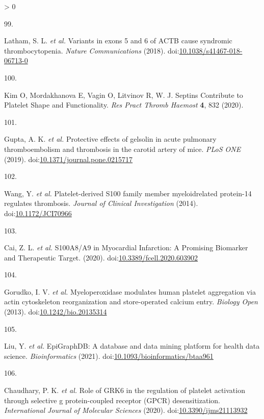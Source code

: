 \documentclass[11pt,twoside]{bristolthesis}
\newlength{\cslhangindent}
\newlength{\csllabelwidth}
\newenvironment{CSLReferences}[2] %
 {%
  \setlength{\parindent}{0pt}
  \ifodd #1 \everypar{\setlength{\hangindent}{\cslhangindent}}\ignorespaces\fi
  \ifnum #2 > 0
  \setlength{\parskip}{#2\baselineskip}
  \fi
 }%
 {}
\newcommand{\CSLLeftMargin}[1]{\parbox[t]{\csllabelwidth}{#1}}
\newcommand{\CSLRightInline}[1]{\parbox[t]{\linewidth - \csllabelwidth}{#1}\break}
\begin{document}
\begin{CSLReferences}{0}{0}
\leavevmode\hypertarget{ref-Latham2018}{}%
\CSLLeftMargin{99. }
\CSLRightInline{Latham, S. L. \emph{et al.} {Variants in exons 5 and 6 of ACTB cause syndromic thrombocytopenia}. \emph{Nature Communications} (2018). doi:\href{https://doi.org/10.1038/s41467-018-06713-0}{10.1038/s41467-018-06713-0}}

\leavevmode\hypertarget{ref-Kim2020}{}%
\CSLLeftMargin{100. }
\CSLRightInline{Kim O, Mordakhanova E, Vagin O, Litvinov R, W. J. {Septins Contribute to Platelet Shape and Functionality}. \emph{Res Pract Thromb Haemost} \textbf{4}, 832 (2020).}

\leavevmode\hypertarget{ref-Gupta2019}{}%
\CSLLeftMargin{101. }
\CSLRightInline{Gupta, A. K. \emph{et al.} {Protective effects of gelsolin in acute pulmonary thromboembolism and thrombosis in the carotid artery of mice}. \emph{PLoS ONE} (2019). doi:\href{https://doi.org/10.1371/journal.pone.0215717}{10.1371/journal.pone.0215717}}

\leavevmode\hypertarget{ref-Wang2014a}{}%
\CSLLeftMargin{102. }
\CSLRightInline{Wang, Y. \emph{et al.} {Platelet-derived S100 family member myeloidrelated protein-14 regulates thrombosis}. \emph{Journal of Clinical Investigation} (2014). doi:\href{https://doi.org/10.1172/JCI70966}{10.1172/JCI70966}}

\leavevmode\hypertarget{ref-Cai2020}{}%
\CSLLeftMargin{103. }
\CSLRightInline{Cai, Z. L. \emph{et al.} {S100A8/A9 in Myocardial Infarction: A Promising Biomarker and Therapeutic Target}. (2020). doi:\href{https://doi.org/10.3389/fcell.2020.603902}{10.3389/fcell.2020.603902}}

\leavevmode\hypertarget{ref-Gorudko2013}{}%
\CSLLeftMargin{104. }
\CSLRightInline{Gorudko, I. V. \emph{et al.} {Myeloperoxidase modulates human platelet aggregation via actin cytoskeleton reorganization and store-operated calcium entry}. \emph{Biology Open} (2013). doi:\href{https://doi.org/10.1242/bio.20135314}{10.1242/bio.20135314}}

\leavevmode\hypertarget{ref-Liu2021}{}%
\CSLLeftMargin{105. }
\CSLRightInline{Liu, Y. \emph{et al.} {EpiGraphDB: A database and data mining platform for health data science}. \emph{Bioinformatics} (2021). doi:\href{https://doi.org/10.1093/bioinformatics/btaa961}{10.1093/bioinformatics/btaa961}}

\leavevmode\hypertarget{ref-Chaudhary2020}{}%
\CSLLeftMargin{106. }
\CSLRightInline{Chaudhary, P. K. \emph{et al.} {Role of GRK6 in the regulation of platelet activation through selective g protein-coupled receptor (GPCR) desensitization}. \emph{International Journal of Molecular Sciences} (2020). doi:\href{https://doi.org/10.3390/ijms21113932}{10.3390/ijms21113932}}


\end{CSLReferences}
\end{document}
